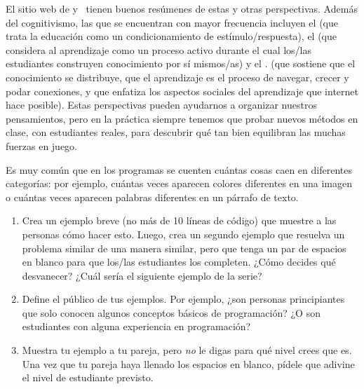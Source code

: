 El sitio web de 
y~\cite{Wibu2016}
tienen buenos resúmenes de estas y otras perspectivas.
Además del cognitivismo, las que se encuentran con mayor frecuencia incluyen el 
(que trata la educación como un condicionamiento de estímulo/respuesta),
el 
(que considera al aprendizaje como un proceso activo durante el cual los/las estudiantes construyen conocimiento por sí mismos/as)
y el .
(que sostiene que el conocimiento se distribuye,
que el aprendizaje es el proceso de navegar, crecer y podar conexiones,
y que enfatiza los aspectos sociales del aprendizaje que internet hace posible).
Estas perspectivas pueden ayudarnos a organizar nuestros pensamientos,
pero en la práctica
siempre tenemos que probar nuevos métodos en clase,
con estudiantes reales,
para descubrir qué tan bien equilibran las muchas fuerzas en juego.



Es muy común que en los programas se cuenten cuántas cosas caen en diferentes categorías:
por ejemplo,
cuántas veces aparecen colores diferentes en una imagen
o cuántas veces aparecen palabras diferentes en un párrafo de texto.

\begin{enumerate}
\item
    Crea un ejemplo breve (no más de 10 líneas de código) que muestre a las personas cómo hacer esto.
    Luego, crea un segundo ejemplo que resuelva un problema similar de una manera similar,
    pero que tenga un par de espacios en blanco para que los/las estudiantes los completen.
    ¿Cómo decides qué desvanecer?
    ¿Cuál sería el siguiente ejemplo de la serie?

\item
    Define el público de tus ejemplos.
    Por ejemplo,
    ¿son personas principiantes que solo conocen algunos conceptos básicos de programación?
    ¿O son estudiantes con alguna experiencia en programación?

\item
    Muestra tu ejemplo a tu pareja,
    pero \emph{no} le digas para qué nivel crees que es.
    Una vez que tu pareja haya llenado los espacios en blanco,
    pídele que adivine el nivel de estudiante previsto.

\end{enumerate}

